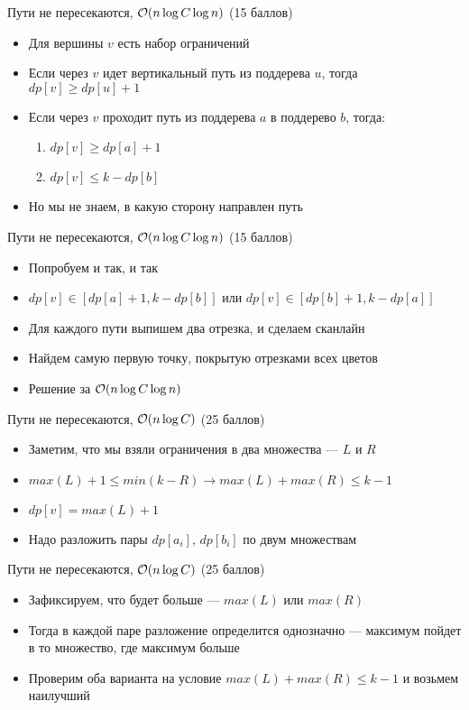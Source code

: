 \begin{frame}{Пути не пересекаются, $\mathcal{O}(n \log C \log n)$ (15 баллов)}
  \begin{itemize}
    \item Для вершины $v$ есть набор ограничений
    \item Если через $v$ идет вертикальный путь из поддерева $u$, тогда $dp[v] \ge dp[u] + 1$
    \item Если через $v$ проходит путь из поддерева $a$ в поддерево $b$, тогда:
    \begin{enumerate}
        \item $dp[v] \ge dp[a] + 1$
        \item $dp[v] \le k - dp[b]$
    \end{enumerate}
    \item Но мы не знаем, в какую сторону направлен путь
  \end{itemize}
\end{frame}

\begin{frame}{Пути не пересекаются, $\mathcal{O}(n \log C \log n)$ (15 баллов)}
  \begin{itemize}
    \item Попробуем и так, и так
    \item $dp[v] \in [dp[a] + 1, k - dp[b]]$ или $dp[v] \in [dp[b] + 1, k - dp[a]]$
    \item Для каждого пути выпишем два отрезка, и сделаем сканлайн
    \item Найдем самую первую точку, покрытую отрезками всех цветов
    \item Решение за $\mathcal{O}(n \log C \log n)$
  \end{itemize}
\end{frame}

\begin{frame}{Пути не пересекаются, $\mathcal{O}(n \log C)$ (25 баллов)}
  \begin{itemize}
    \item Заметим, что мы взяли ограничения в два множества --- $L$ и $R$
    \item $max(L) + 1 \le min(k - R) \rightarrow max(L) + max(R) \le k - 1$
    \item $dp[v] = max(L) + 1$
    \item Надо разложить пары $dp[a_i],\,dp[b_i]$ по двум множествам
  \end{itemize}
\end{frame}

\begin{frame}{Пути не пересекаются, $\mathcal{O}(n \log C)$ (25 баллов)}
  \begin{itemize}
    \item Зафиксируем, что будет больше --- $max(L)$ или $max(R)$
    \item Тогда в каждой паре разложение определится однозначно --- максимум пойдет в то множество, где максимум больше
    \item Проверим оба варианта на условие $max(L) + max(R) \le k - 1$ и возьмем наилучший
  \end{itemize}
\end{frame}


